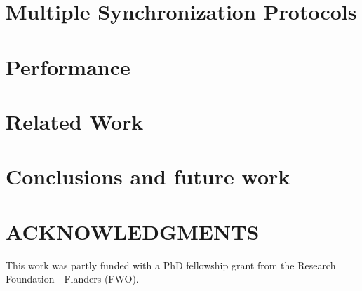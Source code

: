 \documentclass{scs}
\begin{document}
\section{Multiple Synchronization Protocols}
\label{sec:3-features}


\section{Performance}
\label{sec:4-performance}


\section{Related Work}
\label{sec:5-related-work}


\section{Conclusions and future work}
\label{sec:6-conclusion}


\section*{ACKNOWLEDGMENTS}
This work was partly funded with a PhD fellowship grant from the Research Foundation - Flanders (FWO). 



\end{document}

